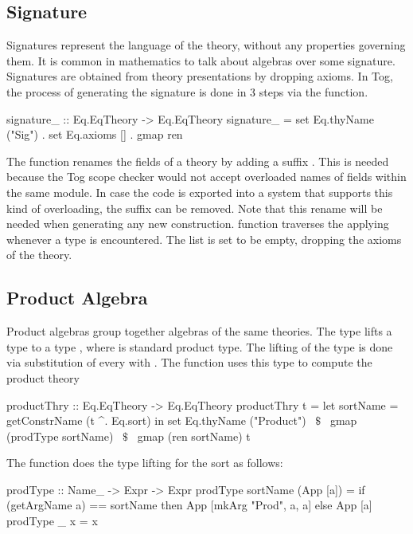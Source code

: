 \subsection{Signature}
Signatures represent the language of the theory, without any properties governing them. It is common in mathematics to talk about algebras over some signature. Signatures are obtained from theory presentations by dropping axioms. In Tog, the process of generating the signature is done in $3$ steps via the  function. 
\begin{hscode}
signature_ :: Eq.EqTheory -> Eq.EqTheory
signature_ = set Eq.thyName ("Sig") . set Eq.axioms [] .  gmap ren
\end{hscode}
\noindent The function  renames the fields of a theory by adding a suffix . This is needed because the Tog scope checker would not accept overloaded names of fields within the same module. In case the code is exported into a system that supports this kind of overloading, the suffix can be removed. Note that this rename will be needed when generating any new construction.  function traverses the  applying  whenever a  type is encountered.  
The  list is set to be empty, dropping the axioms of the theory. 

\subsection{Product Algebra} 
Product algebras group together algebras of the same theories. 
The type  lifts a type  to a type , where  is standard product type. 
The lifting of the type  is done via substitution of every  with . 
The function  uses this type to compute the product theory 
\begin{hscode}
productThry :: Eq.EqTheory -> Eq.EqTheory
productThry t =
 let sortName = getConstrName (t ^. Eq.sort)  
 in set Eq.thyName ("Product") ~$\$$~     
    gmap (prodType sortName) ~$\$$~
    gmap (ren sortName) t
\end{hscode}
The  function does the type lifting for the sort as follows: 
\begin{hscode} 
prodType :: Name_ -> Expr -> Expr
prodType sortName (App [a]) =
  if (getArgName a) == sortName 
  then App [mkArg "Prod", a, a] else App [a] 
prodType _ x = x 
\end{hscode} 

